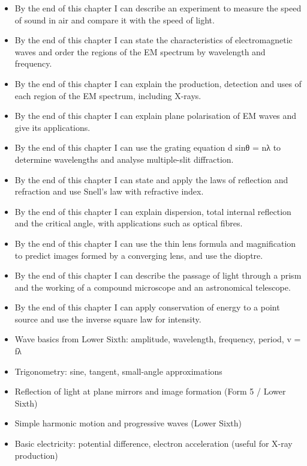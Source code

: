 \documentclass[11pt]{article}
\begin{document}
\begin{objectifs}
\begin{itemize}
\item By the end of this chapter I can describe an experiment to measure the speed of sound in air and compare it with the speed of light.
\item By the end of this chapter I can state the characteristics of electromagnetic waves and order the regions of the EM spectrum by wavelength and frequency.
\item By the end of this chapter I can explain the production, detection and uses of each region of the EM spectrum, including X-rays.
\item By the end of this chapter I can explain plane polarisation of EM waves and give its applications.
\item By the end of this chapter I can use the grating equation d sinθ = nλ to determine wavelengths and analyse multiple-slit diffraction.
\item By the end of this chapter I can state and apply the laws of reflection and refraction and use Snell's law with refractive index.
\item By the end of this chapter I can explain dispersion, total internal reflection and the critical angle, with applications such as optical fibres.
\item By the end of this chapter I can use the thin lens formula and magnification to predict images formed by a converging lens, and use the dioptre.
\item By the end of this chapter I can describe the passage of light through a prism and the working of a compound microscope and an astronomical telescope.
\item By the end of this chapter I can apply conservation of energy to a point source and use the inverse square law for intensity.
\end{itemize}
\end{objectifs}

\begin{prerequis}
\begin{itemize}
\item Wave basics from Lower Sixth: amplitude, wavelength, frequency, period, v = fλ
\item Trigonometry: sine, tangent, small-angle approximations
\item Reflection of light at plane mirrors and image formation (Form 5 / Lower Sixth)
\item Simple harmonic motion and progressive waves (Lower Sixth)
\item Basic electricity: potential difference, electron acceleration (useful for X-ray production)
\end{itemize}
\end{prerequis}
\end{document}
